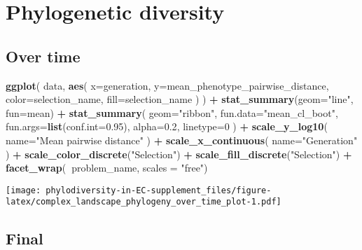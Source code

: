 \documentclass[]{book}
\newenvironment{Shaded}{\begin{snugshade}}{\end{snugshade}}
\newcommand{\DataTypeTok}[1]{\textcolor[rgb]{0.13,0.29,0.53}{#1}}
\newcommand{\DecValTok}[1]{\textcolor[rgb]{0.00,0.00,0.81}{#1}}
\newcommand{\FloatTok}[1]{\textcolor[rgb]{0.00,0.00,0.81}{#1}}
\newcommand{\KeywordTok}[1]{\textcolor[rgb]{0.13,0.29,0.53}{\textbf{#1}}}
\newcommand{\NormalTok}[1]{#1}
\newcommand{\OperatorTok}[1]{\textcolor[rgb]{0.81,0.36,0.00}{\textbf{#1}}}
\newcommand{\StringTok}[1]{\textcolor[rgb]{0.31,0.60,0.02}{#1}}
\begin{document}
\hypertarget{phylogenetic-diversity-1}{%
\section{Phylogenetic diversity}\label{phylogenetic-diversity-1}}

\hypertarget{over-time-4}{%
\subsection{Over time}\label{over-time-4}}

\begin{Shaded}
\begin{Highlighting}[]
\KeywordTok{ggplot}\NormalTok{(}
\NormalTok{    data,}
    \KeywordTok{aes}\NormalTok{(}
      \DataTypeTok{x=}\NormalTok{generation,}
      \DataTypeTok{y=}\NormalTok{mean_phenotype_pairwise_distance,}
      \DataTypeTok{color=}\NormalTok{selection_name,}
      \DataTypeTok{fill=}\NormalTok{selection_name}
\NormalTok{    )}
\NormalTok{  ) }\OperatorTok{+}
\StringTok{  }\KeywordTok{stat_summary}\NormalTok{(}\DataTypeTok{geom=}\StringTok{"line"}\NormalTok{, }\DataTypeTok{fun=}\NormalTok{mean) }\OperatorTok{+}
\StringTok{  }\KeywordTok{stat_summary}\NormalTok{(}
    \DataTypeTok{geom=}\StringTok{"ribbon"}\NormalTok{,}
    \DataTypeTok{fun.data=}\StringTok{"mean_cl_boot"}\NormalTok{,}
    \DataTypeTok{fun.args=}\KeywordTok{list}\NormalTok{(}\DataTypeTok{conf.int=}\FloatTok{0.95}\NormalTok{),}
    \DataTypeTok{alpha=}\FloatTok{0.2}\NormalTok{,}
    \DataTypeTok{linetype=}\DecValTok{0}
\NormalTok{  ) }\OperatorTok{+}
\StringTok{  }\KeywordTok{scale_y_log10}\NormalTok{(}
    \DataTypeTok{name=}\StringTok{"Mean pairwise distance"}
\NormalTok{  ) }\OperatorTok{+}
\StringTok{  }\KeywordTok{scale_x_continuous}\NormalTok{(}
    \DataTypeTok{name=}\StringTok{"Generation"}
\NormalTok{  ) }\OperatorTok{+}
\StringTok{  }\KeywordTok{scale_color_discrete}\NormalTok{(}\StringTok{"Selection"}\NormalTok{) }\OperatorTok{+}
\StringTok{  }\KeywordTok{scale_fill_discrete}\NormalTok{(}\StringTok{"Selection"}\NormalTok{) }\OperatorTok{+}
\StringTok{  }\KeywordTok{facet_wrap}\NormalTok{(}\OperatorTok{~}\NormalTok{problem_name, }\DataTypeTok{scales =} \StringTok{"free"}\NormalTok{)}
\end{Highlighting}
\end{Shaded}

\texttt{[image: phylodiversity-in-EC-supplement\_files/figure-latex/complex\_landscape\_phylogeny\_over\_time\_plot-1.pdf]}

\hypertarget{final-4}{%
\subsection{Final}\label{final-4}}
\end{document}
